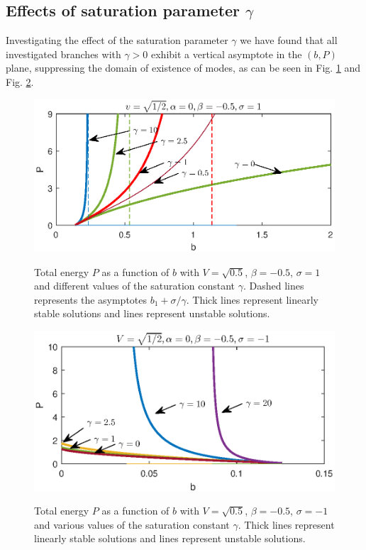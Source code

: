 \documentclass[aps,pre,showpacs,twocolumn]{revtex4}
\begin{document}
\subsection{Effects of saturation parameter $\gamma$}
Investigating the effect of the saturation parameter $\gamma$ we have found that all investigated branches with $\gamma>0$ exhibit a vertical asymptote in the 
$(b,P)$ plane, suppressing the domain of existence of modes, as can be seen in Fig. \ref{fig:gamma_branchesV05sigma1} and Fig. \ref{fig:gamma_branchesV05sigma-1}.
\begin{figure}[!htb]
\begin{center}
\scalebox{.6} {\includegraphics{branches_V05_ds-05_c0_sigma1.eps}}
\end{center}
\caption{Total energy $P$ as a function of $b$ with $V=\sqrt{0.5}$, $\beta=-0.5$, $\sigma=1$ and different values of the saturation constant $\gamma$. Dashed lines represents the asymptotes $b_1+\sigma/\gamma$. Thick lines represent linearly stable solutions and lines represent unstable solutions.}
\label{fig:gamma_branchesV05sigma1}
\end{figure}
\begin{figure}[!htb]
\begin{center}
\scalebox{.67} {\includegraphics{branches_V05_ds-05_c0_sigma-1.eps}}
\end{center}
\caption{Total energy $P$ as a function of $b$ with $V=\sqrt{0.5}$, $\beta=-0.5$, $\sigma=-1$ and various values of the saturation constant $\gamma$. Thick lines represent linearly stable solutions and lines represent unstable solutions.}
\label{fig:gamma_branchesV05sigma-1}
\end{figure}
\end{document}
